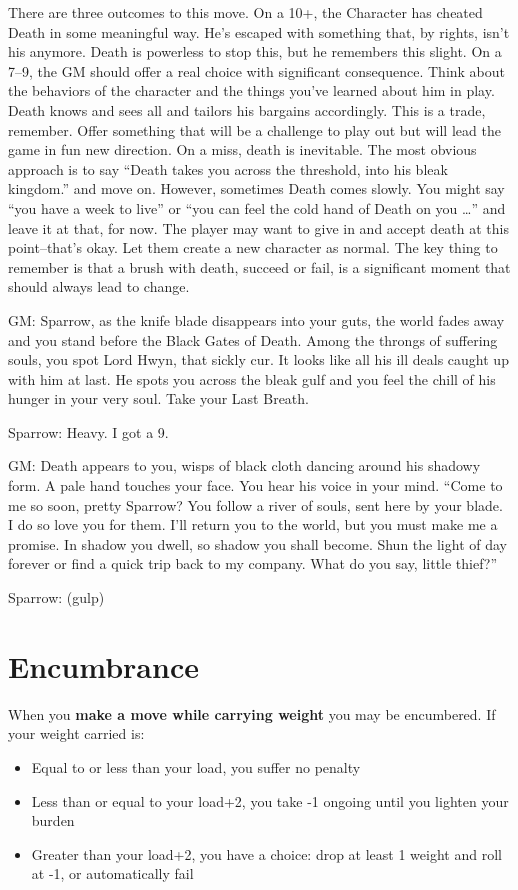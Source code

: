  There are three outcomes to this move. On a 10+, the Character has cheated Death in some meaningful way. He's escaped with something that, by rights, isn't his anymore. Death is powerless to stop this, but he remembers this slight. On a 7--9, the GM should offer a real choice with significant consequence. Think about the behaviors of the character and the things you've learned about him in play. Death knows and sees all and tailors his bargains accordingly. This is a trade, remember. Offer something that will be a challenge to play out but will lead the game in fun new direction. On a miss, death is inevitable. The most obvious approach is to say ``Death takes you across the threshold, into his bleak kingdom.'' and move on. However, sometimes Death comes slowly. You might say ``you have a week to live'' or ``you can feel the cold hand of Death on you \ldots '' and leave it at that, for now. The player may want to give in and accept death at this point--that's okay. Let them create a new character as normal. The key thing to remember is that a brush with death, succeed or fail, is a significant moment that should always lead to change.


 GM: Sparrow, as the knife blade disappears into your guts, the world fades away and you stand before the Black Gates of Death. Among the throngs of suffering souls, you spot Lord Hwyn, that sickly cur. It looks like all his ill deals caught up with him at last. He spots you across the bleak gulf and you feel the chill of his hunger in your very soul. Take your Last Breath.


 Sparrow: Heavy. I got a 9.


 GM: Death appears to you, wisps of black cloth dancing around his shadowy form. A pale hand touches your face. You hear his voice in your mind. ``Come to me so soon, pretty Sparrow? You follow a river of souls, sent here by your blade. I do so love you for them. I'll return you to the world, but you must make me a promise. In shadow you dwell, so shadow you shall become. Shun the light of day forever or find a quick trip back to my company. What do you say, little thief?''


 Sparrow: (gulp)
\section{Encumbrance}


 When you \textbf{make a move while carrying weight}
 you may be encumbered. If your weight carried is:
\begin{itemize}
\item Equal to or less than your load, you suffer no penalty
\item Less than or equal to your load+2, you take -1 ongoing until you lighten your burden
\item Greater than your load+2, you have a choice: drop at least 1 weight and roll at -1, or automatically fail

\end{itemize}


